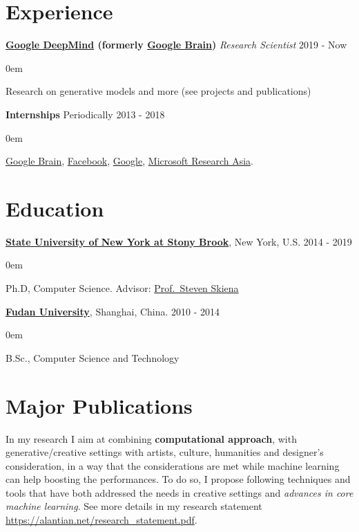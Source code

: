\documentclass[line,margin]{cv}
\makeatletter
\newenvironment{block}
{
  \begin{addmargin}[2em]{0em}%
}
{
  \end{addmargin}
}
\newcommand{\SUNY}{\href{http://www.stonybrook.edu/}{State University of New York at Stony Brook}}
\newcommand{\Google}{\href{https://www.google.com/}{Google}}
\newcommand{\GoogleBrain}{\href{http://research.google.com/teams/brain/}{Google Brain}}
\newcommand{\GoogleDeepMind}{\href{https://www.deepmind.com/}{Google DeepMind}}
\newcommand{\Facebook}{\href{https://www.facebook.com/}{Facebook}}
\newcommand{\Fudan}{\href{http://www.fudan.edu.cn/englishnew/}{Fudan University}}
\newcommand{\MyMail}{\href{mailto:alan.yt.tian@gmail.com}{alan.yt.tian@gmail.com}}
\newcommand{\MSRA}{\href{http://research.microsoft.com/en-us/labs/asia/default.aspx}{Microsoft Research Asia}}
\newcommand{\Skiena}{\href{https://www3.cs.stonybrook.edu/~skiena/}{Prof.\ Steven Skiena}}
\makeatother
\begin{document}

\address{\textit{E-mail:} \MyMail}

\begin{resume}

\section{Experience}

  {\bf \GoogleDeepMind{} (formerly \GoogleBrain)} {\itshape Research Scientist} \hfill 2019 - Now
  \begin{block}
    Research on generative models and more (see projects and publications)
  \end{block}

  {\bf Internships} \hfill Periodically 2013 - 2018
  \begin{block}
    \GoogleBrain{},  \Facebook{}, \Google{}, \MSRA{}.
  \end{block}

\section{Education}

  {\bf \SUNY}, New York, U.S. \hfill 2014 - 2019
  \begin{block}
    Ph.D, Computer Science. Advisor: \Skiena
  \end{block}

  {\bf \Fudan}, Shanghai, China. \hfill 2010 - 2014

  \begin{block}
    B.Sc., Computer Science and Technology 
  \end{block}



\section{Major Publications}

  In my research I aim at combining \textbf{computational approach}, with {generative/creative settings} with artists, culture, humanities and designer's consideration, in a way that the considerations are met while machine learning can help boosting the performances. To do so, I propose following techniques and tools that have both {addressed the needs in creative settings} and \emph{advances in core machine learning}. See more details in my research statement {\url{https://alantian.net/research_statement.pdf}}.


\end{resume}
\end{document}
